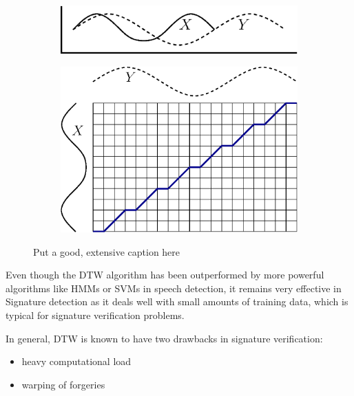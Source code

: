 \documentclass[a4paper, oneside]{csthesis}
\begin{document}
\begin{figure}
        \centering
        \begin{subfigure}[b]{0.45\textwidth}
                \centering
                \includegraphics[width=\textwidth]{figures/dtw-graphic1.eps}
                \label{fig:hmm1}
        \end{subfigure}%
        \quad
        \begin{subfigure}[b]{0.45\textwidth}
                \centering
                \includegraphics[width=\textwidth]{figures/dtw-graphic2.eps}
                \label{fig:hmm1}
        \end{subfigure}%

        \caption{Put a good, extensive caption here}
        \label{fig:dtw-matrix}
\end{figure}



Even though the DTW algorithm has been outperformed by more powerful algorithms like HMMs or SVMs in speech detection, it remains very effective in Signature detection as it deals well with small amounts of training data, which is typical for signature verification problems.

In general, DTW is known to have two drawbacks in signature verification:
\begin{itemize}
\item heavy computational load
\item warping of forgeries
\end{itemize}
\end{document}
